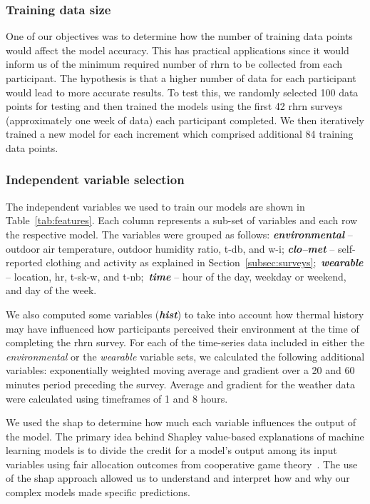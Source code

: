 \subsubsection{Training data size}\label{subsubsec:pm}
One of our objectives was to determine how the number of training data points would affect the model accuracy.
This has practical applications since it would inform us of the minimum required number of \ac{rhrn} to be collected from each participant.
The hypothesis is that a higher number of data for each participant would lead to more accurate results.
To test this, we randomly selected 100 data points for testing and then trained the models using the first 42 \ac{rhrn} surveys (approximately one week of data) each participant completed.
We then iteratively trained a new model for each increment which comprised additional 84 training data points.

\subsubsection{Independent variable selection}\label{subsubsec:feature-selection}
The independent variables we used to train our models are shown in Table~\ref{tab:features}.
Each column represents a sub-set of variables and each row the respective model.
The variables were grouped as follows:
\textbf{\textit{environmental}} -- outdoor air temperature, outdoor humidity ratio, \acf{t-db}, and \acf{w-i};
\textbf{\textit{clo--met}} -- self-reported clothing and activity as explained in Section~\ref{subsec:surveys};\
\textbf{\textit{wearable}} -- location, \acf{hr}, \acf{t-sk-w}, and \acf{t-nb};\
\textbf{\textit{time}} -- hour of the day, weekday or weekend, and day of the week.


We also computed some variables (\textbf{\textit{hist}}) to take into account how thermal history may have influenced how participants perceived their environment at the time of completing the \ac{rhrn} survey.
For each of the time-series data included in either the \textit{environmental} or the \textit{wearable} variable sets, we calculated the following additional variables: exponentially weighted moving average and gradient over a 20 and 60 minutes period preceding the survey.
Average and gradient for the weather data were calculated using timeframes of 1 and 8 hours.

We used the \gls{shap} to determine how much each variable influences the output of the model.
The primary idea behind Shapley value-based explanations of machine learning models is to divide the credit for a model's output among its input variables using fair allocation outcomes from cooperative game theory~\cite{NIPS2017_7062, shap2016}.
The use of the \gls{shap} approach allowed us to understand and interpret how and why our complex models made
specific predictions.

